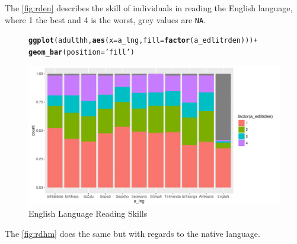 \documentclass[a4paper,british]{article}\usepackage[]{graphicx}\usepackage[]{color}
\makeatletter
\def\maxwidth{ %
  \ifdim\Gin@nat@width>\linewidth
    \linewidth
  \else
    \Gin@nat@width
  \fi
}
\newcommand{\hlstr}[1]{\textcolor[rgb]{0.192,0.494,0.8}{#1}}%
\newcommand{\hlopt}[1]{\textcolor[rgb]{0,0,0}{#1}}%
\newcommand{\hlstd}[1]{\textcolor[rgb]{0.345,0.345,0.345}{#1}}%
\newcommand{\hlkwc}[1]{\textcolor[rgb]{0.333,0.667,0.333}{#1}}%
\newcommand{\hlkwd}[1]{\textcolor[rgb]{0.737,0.353,0.396}{\textbf{#1}}}%
\newenvironment{kframe}{%
 \def\at@end@of@kframe{}%
 \ifinner\ifhmode%
  \def\at@end@of@kframe{\end{minipage}}%
  \begin{minipage}{\columnwidth}%
 \fi\fi%
 \def\FrameCommand##1{\hskip\@totalleftmargin \hskip-\fboxsep
 \colorbox{shadecolor}{##1}\hskip-\fboxsep
     \hskip-\linewidth \hskip-\@totalleftmargin \hskip\columnwidth}%
 \MakeFramed {\advance\hsize-\width
   \@totalleftmargin\z@ \linewidth\hsize
   \@setminipage}}%
 {\par\unskip\endMakeFramed%
 \at@end@of@kframe}
\newenvironment{knitrout}{}{} %
\providecommand*{\code}[1]{\texttt{#1}}
\let\ref\autoref
\makeatother
\begin{document}
The \ref{fig:rden} describes the skill of individuals in reading
the English language, where 1 the best and 4 is the worst, grey values
are \code{NA}.

\begin{figure}[H]
\caption{English Language Reading Skills}
\label{fig:rden}

\begin{knitrout}
\color{fgcolor}\begin{kframe}
\begin{alltt}
\hlkwd{ggplot}\hlstd{(adulthh,} \hlkwd{aes}\hlstd{(}\hlkwc{x} \hlstd{= a_lng,} \hlkwc{fill} \hlstd{=} \hlkwd{factor}\hlstd{(a_edlitrden)) )} \hlopt{+}
        \hlkwd{geom_bar}\hlstd{(}\hlkwc{position} \hlstd{=} \hlstr{'fill'}\hlstd{)}
\end{alltt}
\end{kframe}
\includegraphics[width=\maxwidth]{../misc/latex-read_english-1} 

\end{knitrout}
\end{figure}

The \ref{fig:rdhm} does the same but with regards to the native language.
\end{document}
